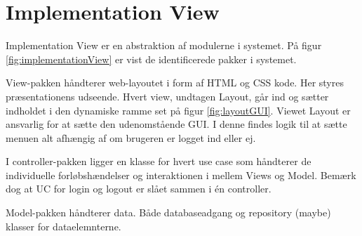 \section{Implementation View}
Implementation View er en abstraktion af modulerne i systemet. På figur \ref{fig:implementationView} er vist de identificerede pakker i systemet.


View-pakken håndterer web-layoutet i form af HTML og CSS kode. Her styres præsentationens udseende.
Hvert view, undtagen Layout, går ind og sætter indholdet i den dynamiske ramme set på figur \ref{fig:layoutGUI}. Viewet Layout er ansvarlig for at sætte den udenomstående GUI. I denne findes logik til at sætte menuen alt afhængig af om brugeren er logget ind eller ej.

I controller-pakken ligger en klasse for hvert use case som håndterer de individuelle forløbshændelser og interaktionen i mellem Views og Model. Bemærk dog at UC for login og logout er slået sammen i én controller.

Model-pakken håndterer data. Både databaseadgang og repository (maybe) klasser for dataelemnterne.